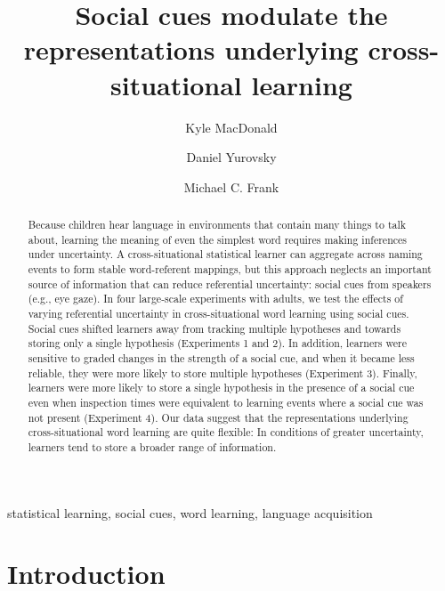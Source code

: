 \documentclass[authoryear, review]{elsarticle}
\date{}
\begin{document}
\begin{frontmatter}

\title{Social cues modulate the representations underlying cross-situational
learning}

\author[km]{Kyle MacDonald}
\author[dy]{Daniel Yurovsky}
\author[mcf]{Michael C. Frank}
\address{Department of Psychology, Stanford University, United States}


\begin{abstract}
Because children hear language in environments that contain many things
to talk about, learning the meaning of even the simplest word requires
making inferences under uncertainty. A cross-situational statistical
learner can aggregate across naming events to form stable word-referent
mappings, but this approach neglects an important source of information
that can reduce referential uncertainty: social cues from speakers
(e.g., eye gaze). In four large-scale experiments with adults, we test
the effects of varying referential uncertainty in cross-situational word
learning using social cues. Social cues shifted learners away from
tracking multiple hypotheses and towards storing only a single
hypothesis (Experiments 1 and 2). In addition, learners were sensitive
to graded changes in the strength of a social cue, and when it became
less reliable, they were more likely to store multiple hypotheses
(Experiment 3). Finally, learners were more likely to store a single
hypothesis in the presence of a social cue even when inspection times
were equivalent to learning events where a social cue was not present
(Experiment 4). Our data suggest that the representations underlying
cross-situational word learning are quite flexible: In conditions of
greater uncertainty, learners tend to store a broader range of
information.
\end{abstract}

\begin{keyword}
statistical learning, social cues, word learning, language acquisition
\end{keyword}

\end{frontmatter}

\section{Introduction}\label{introduction}
\end{document}
